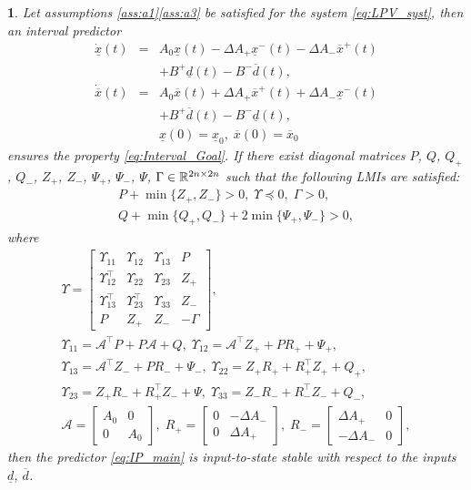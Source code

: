 \documentclass[letterpaper, 10 pt, conference]{ieeeconf}
\theoremstyle{plain}
\theoremstyle{definition}
\theoremstyle{plain}
\theoremstyle{plain}
\newtheorem{thm}{\protect\theoremname}
\theoremstyle{remark}
\providecommand{\theoremname}{Theorem}
\begin{document}
\begin{thm}
\label{thm:main} Let assumptions \ref{ass:a1}\textendash \ref{ass:a3} be satisfied for the system \eqref{eq:LPV_syst}, then an interval predictor
\begin{eqnarray}
\dot{\underline{x}}(t) & = & A_{0}\underline{x}(t)-\Delta A_{+}\underline{x}^{-}(t)-\Delta A_{-}\overline{x}^{+}(t)\nonumber \\
 &  & +B^{+}\underline{d}(t)-B^{-}\overline{d}(t),\label{eq:IP_main}\\
\dot{\overline{x}}(t) & = & A_{0}\overline{x}(t)+\Delta A_{+}\overline{x}^{+}(t)+\Delta A_{-}\underline{x}^{-}(t)\nonumber \\
 &  & +B^{+}\overline{d}(t)-B^{-}\underline{d}(t),\nonumber \\
 &  & \underline{x}(0)=\underline{x}_{0},\;\overline{x}(0)=\overline{x}_{0}\nonumber 
\end{eqnarray}
ensures the property \eqref{eq:Interval_Goal}. If there exist diagonal matrices $P$, $Q$, $Q_{+}$, $Q_{-}$, $Z_{+}$, $Z_{-}$, $\Psi_{+}$, $\Psi_{-}$, $\Psi$, $\Gamma\in\mathbb{R}^{2n\times2n}$ such that the following LMIs are satisfied:
\begin{gather*}
P+\min\{Z_{+},Z_{-}\}>0,\;\Upsilon\preceq0,\;\Gamma>0,\\
Q+\min\{Q_{+},Q_{-}\}+2\min\{\Psi_{+},\Psi_{-}\}>0,
\end{gather*}
where{\footnotesize{}
\begin{gather*}
\Upsilon=\left[\begin{array}{cccc}
\Upsilon_{11} & \Upsilon_{12} & \Upsilon_{13} & P\\
\Upsilon_{12}^{\top} & \Upsilon_{22} & \Upsilon_{23} & Z_{+}\\
\Upsilon_{13}^{\top} & \Upsilon_{23}^{\top} & \Upsilon_{33} & Z_{-}\\
P & Z_{+} & Z_{-} & -\Gamma
\end{array}\right],\\
\Upsilon_{11}=\mathcal{A}^{\top}P+P\mathcal{A}+Q,\;\Upsilon_{12}=\mathcal{A}^{\top}Z_{+}+PR_{+}+\Psi_{+},\\
\Upsilon_{13}=\mathcal{A}^{\top}Z_{-}+PR_{-}+\Psi_{-},\;\Upsilon_{22}=Z_{+}R_{+}+R_{+}^{\top}Z_{+}+Q_{+},\\
\Upsilon_{23}=Z_{+}R_{-}+R_{+}^{\top}Z_{-}+\Psi,\;\Upsilon_{33}=Z_{-}R_{-}+R_{-}^{\top}Z_{-}+Q_{-},\\
\mathcal{A}=\left[\begin{array}{cc}
A_{0} & 0\\
0 & A_{0}
\end{array}\right],\;R_{+}=\left[\begin{array}{cc}
0 & -\Delta A_{-}\\
0 & \Delta A_{+}
\end{array}\right],\;R_{-}=\left[\begin{array}{cc}
\Delta A_{+} & 0\\
-\Delta A_{-} & 0
\end{array}\right],
\end{gather*}
}then the predictor \eqref{eq:IP_main} is input-to-state stable with respect to the inputs $\underline{d}$, $\overline{d}$.
\end{thm}
\end{document}
